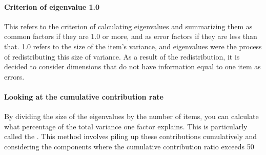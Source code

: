 \documentclass{ltjsbook}
\begin{document}
\paragraph{Criterion of eigenvalue 1.0} This refers to the criterion of calculating eigenvalues and summarizing them as common factors if they are 1.0 or more, and as error factors if they are less than that. 1.0 refers to the size of the item's variance, and eigenvalues were the process of redistributing this size of variance. As a result of the redistribution, it is decided to consider dimensions that do not have information equal to one item as errors.
\paragraph{Looking at the cumulative contribution rate} By dividing the size of the eigenvalues by the number of items, you can calculate what percentage of the total variance one factor explains. This is particularly called the . This method involves piling up these contributions cumulatively and considering the components where the cumulative contribution ratio exceeds 50%
\end{document}
